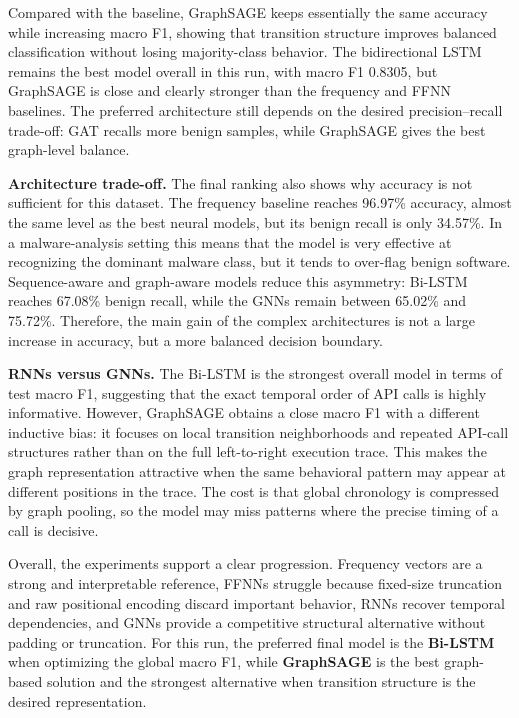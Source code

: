 Compared with the baseline, GraphSAGE keeps essentially the same accuracy while increasing macro F1, showing that transition structure improves balanced classification without losing majority-class behavior. The bidirectional LSTM remains the best model overall in this run, with macro F1 0.8305, but GraphSAGE is close and clearly stronger than the frequency and FFNN baselines. The preferred architecture still depends on the desired precision--recall trade-off: GAT recalls more benign samples, while GraphSAGE gives the best graph-level balance.

\textbf{Architecture trade-off.} The final ranking also shows why accuracy is not sufficient for this dataset. The frequency baseline reaches 96.97\% accuracy, almost the same level as the best neural models, but its benign recall is only 34.57\%. In a malware-analysis setting this means that the model is very effective at recognizing the dominant malware class, but it tends to over-flag benign software. Sequence-aware and graph-aware models reduce this asymmetry: Bi-LSTM reaches 67.08\% benign recall, while the GNNs remain between 65.02\% and 75.72\%. Therefore, the main gain of the complex architectures is not a large increase in accuracy, but a more balanced decision boundary.

\textbf{RNNs versus GNNs.} The Bi-LSTM is the strongest overall model in terms of test macro F1, suggesting that the exact temporal order of API calls is highly informative. However, GraphSAGE obtains a close macro F1 with a different inductive bias: it focuses on local transition neighborhoods and repeated API-call structures rather than on the full left-to-right execution trace. This makes the graph representation attractive when the same behavioral pattern may appear at different positions in the trace. The cost is that global chronology is compressed by graph pooling, so the model may miss patterns where the precise timing of a call is decisive.

Overall, the experiments support a clear progression. Frequency vectors are a strong and interpretable reference, FFNNs struggle because fixed-size truncation and raw positional encoding discard important behavior, RNNs recover temporal dependencies, and GNNs provide a competitive structural alternative without padding or truncation. For this run, the preferred final model is the \textbf{Bi-LSTM} when optimizing the global macro F1, while \textbf{GraphSAGE} is the best graph-based solution and the strongest alternative when transition structure is the desired representation.

